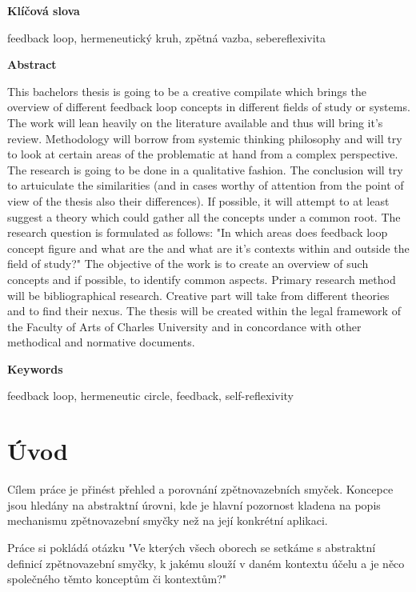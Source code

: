 \documentclass[11pt,a4paper]{article}
\begin{document}
\vspace{1cm}
\noindent \Large \textbf{Klíčová slova}

\noindent feedback loop, hermeneutický kruh, zpětná vazba, sebereflexivita
\pagebreak


\vspace{1cm}
\noindent \Large \textbf{Abstract}

\noindent This bachelors thesis is going to be a creative compilate which brings the overview of different feedback loop concepts in different fields of study or systems. The work will lean heavily on the literature available and thus will bring it's review. Methodology will borrow from systemic thinking philosophy and will try to look at certain areas of the problematic at hand from a complex perspective. The research is going to be done in a qualitative fashion. The conclusion will try to artuiculate the similarities (and in cases worthy of attention from the point of view of the thesis also their differences). If possible, it will attempt to at least suggest a theory which could gather all the concepts under a common root. The research question is formulated as follows: "In which areas does feedback loop concept figure and what are the and what are it's contexts within and outside the field of study?" The objective of the work is to create an overview of such concepts and if possible, to identify common aspects. Primary research method will be bibliographical research. Creative part will take from different theories and to find their nexus. The thesis will be created within the legal framework of the Faculty of Arts of Charles University and in concordance with other methodical and normative documents.


\vspace{1cm}
\noindent \Large \textbf{Keywords}

\noindent feedback loop, hermeneutic circle, feedback, self-reflexivity
\pagebreak


\tableofcontents
\pagebreak


\section*{Úvod}

Cílem práce je přinést přehled a porovnání zpětnovazebních smyček. Koncepce jsou hledány na abstraktní úrovni, kde je hlavní pozornost kladena na popis mechanismu zpětnovazební smyčky než na její konkrétní aplikaci. 

Práce si pokládá otázku "Ve kterých všech oborech se setkáme s abstraktní definicí zpětnovazební smyčky, k jakému slouží v daném kontextu účelu a je něco společného těmto konceptům či kontextům?"
\end{document}
